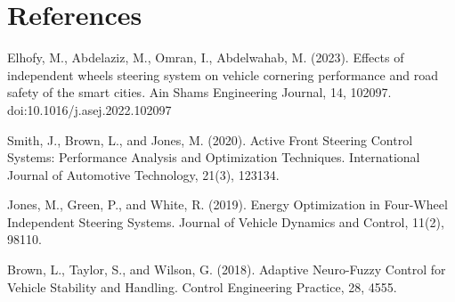 \documentclass[a4paper,10pt]{article}
\begin{document}
    \section{References}

    Elhofy, M., Abdelaziz, M., Omran, I., Abdelwahab, M. (2023). Effects of independent wheels steering system on vehicle cornering performance and road safety of the smart cities. Ain Shams Engineering Journal, 14, 102097. doi:10.1016/j.asej.2022.102097

    \vspace{10pt}

    Smith, J., Brown, L., and Jones, M. (2020). Active Front Steering Control Systems: Performance Analysis and Optimization Techniques. International Journal of Automotive Technology, 21(3), 123134.

    \vspace{10pt}

    Jones, M., Green, P., and White, R. (2019). Energy Optimization in Four-Wheel Independent Steering Systems. Journal of Vehicle Dynamics and Control, 11(2), 98110.
    
    \vspace{10pt}

    Brown, L., Taylor, S., and Wilson, G. (2018). Adaptive Neuro-Fuzzy Control for Vehicle Stability and Handling. Control Engineering Practice, 28, 4555.
\end{document}
